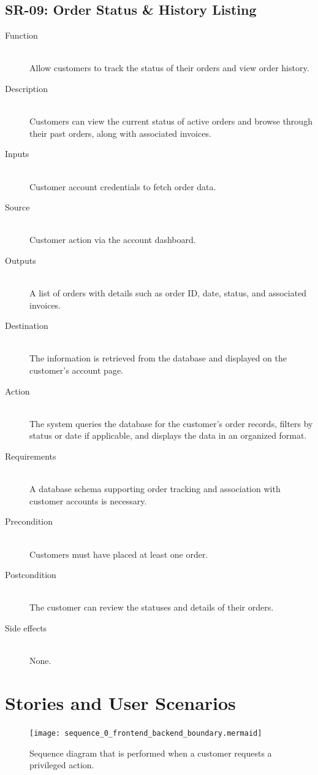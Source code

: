\documentclass[twoside,a4paper,journal]{IEEEtran}
\begin{document}
\subsection{SR-09: Order Status \& History Listing}
\begin{description}
  \item[Function] \hfill \\
  Allow customers to
  track the status of their orders and view order history.
  \item[Description] \hfill \\
  Customers can view the current status of active orders
  and browse through their past orders, along with associated invoices.
  \item[Inputs] \hfill \\
  Customer account credentials to fetch order data.
  \item[Source] \hfill \\
  Customer action via the account dashboard.
  \item[Outputs] \hfill \\
  A list of orders with details such as order ID, date,
  status, and associated invoices.
  \item[Destination] \hfill \\
  The information is retrieved from the database and
  displayed on the customer's account page.
  \item[Action] \hfill \\
  The system queries the database for the customer's
  order records, filters by status or date if applicable, and displays the data
  in an organized format.
  \item[Requirements] \hfill \\
  A database schema supporting order tracking and
  association with customer accounts is necessary.
  \item[Precondition] \hfill \\
  Customers must have placed at least one order.
  \item[Postcondition] \hfill \\
  The customer can review the statuses and details of
  their orders.
  \item[Side effects] \hfill \\
  None.
\end{description}

\section{Stories and User Scenarios}
\begin{figure}[!t]
\centering
\texttt{[image: sequence\_0\_frontend\_backend\_boundary.mermaid]}
\caption{Sequence diagram that is performed when a customer requests a privileged action.}
\label{fig:frontend_backend_boundary}
\end{figure}
\end{document}
